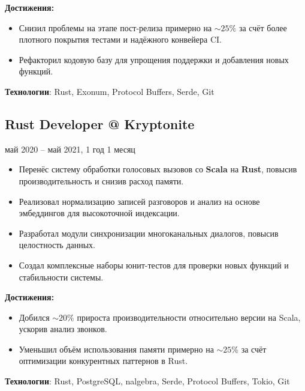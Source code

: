 \documentclass[a4paper,12pt]{article}
\begin{document}
\textbf{Достижения:}
\begin{itemize}[leftmargin=15pt]
    \item Снизил проблемы на этапе пост-релиза примерно на \(\sim 25\%\) за счёт более плотного покрытия тестами и надёжного конвейера CI.
    \item Рефакторил кодовую базу для упрощения поддержки и добавления новых функций.
\end{itemize}

\textbf{Технологии}: Rust, Exonum, Protocol Buffers, Serde, Git

\vspace{3mm}

\subsection*{Rust Developer @ Kryptonite}
\quad май 2020 – май 2021, 1 год 1 месяц
\begin{itemize}[leftmargin=15pt]
    \item Перенёс систему обработки голосовых вызовов со \textbf{Scala} на \textbf{Rust}, повысив производительность и снизив расход памяти.
    \item Реализовал нормализацию записей разговоров и анализ на основе эмбеддингов для высокоточной индексации.
    \item Разработал модули синхронизации многоканальных диалогов, повысив целостность данных.
    \item Создал комплексные наборы юнит-тестов для проверки новых функций и стабильности системы.
\end{itemize}

\textbf{Достижения:}
\begin{itemize}[leftmargin=15pt]
    \item Добился \(\sim 20\%\) прироста производительности относительно версии на Scala, ускорив анализ звонков.
    \item Уменьшил объём использования памяти примерно на \(\sim 25\%\) за счёт оптимизации конкурентных паттернов в Rust.
\end{itemize}

\textbf{Технологии}: Rust, PostgreSQL, nalgebra, Serde, Protocol Buffers, Tokio, Git

\vspace{3mm}
\end{document}

